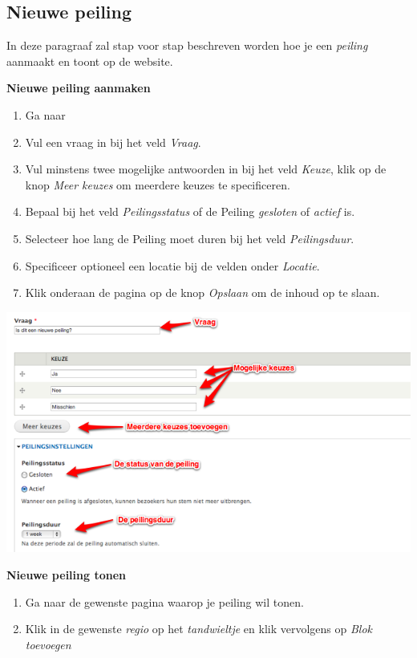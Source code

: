 \subsection{Nieuwe peiling}\label{nieuwepeiling}
In deze paragraaf zal stap voor stap beschreven worden hoe je een \emph{peiling} aanmaakt en toont op de website.

\textbf{Nieuwe peiling aanmaken}

\begin{enumerate}
\item Ga naar 
\item Vul een vraag in bij het veld \emph{Vraag}.
\item Vul minstens twee mogelijke antwoorden in bij het veld \emph{Keuze}, klik op de knop \emph{Meer keuzes} om meerdere keuzes te specificeren.
\item Bepaal bij het veld \emph{Peilingsstatus} of de Peiling \emph{gesloten} of \emph{actief} is.
\item Selecteer hoe lang de Peiling moet duren bij het veld \emph{Peilingsduur}.
\item Specificeer optioneel een locatie bij de velden onder \emph{Locatie}.
\item Klik onderaan de pagina op de knop \emph{Opslaan} om de inhoud op te slaan.
\end{enumerate}

\begin{center}
	\includegraphics[width=\textwidth]{img/peiling_1.png}
\end{center}


\textbf{Nieuwe peiling tonen}

\begin{enumerate}
\item Ga naar de gewenste pagina waarop je peiling wil tonen.
\item Klik in de gewenste \emph{regio} op het \emph{tandwieltje} en klik vervolgens op \emph{Blok toevoegen}
\end{enumerate}

